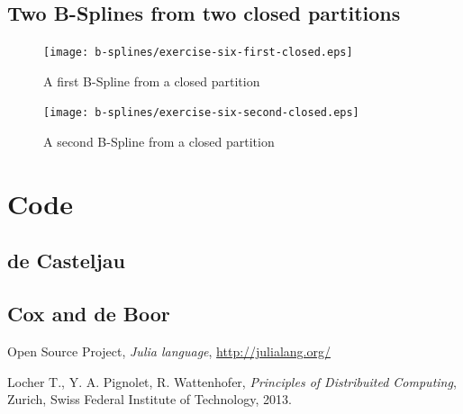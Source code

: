 \documentclass{article}
\begin{document}
\subsection{Two B-Splines from two closed partitions}
\begin{figure}
  \centering
  \texttt{[image: b-splines/exercise-six-first-closed.eps]}
  \caption{A first B-Spline from a closed partition }
  \label{fig:bspline-exercise-six-first}
\end{figure}

\begin{figure}
  \centering
  \texttt{[image: b-splines/exercise-six-second-closed.eps]}
  \caption{A second B-Spline from a closed partition }
  \label{fig:bspline-exercise-six-second}
\end{figure}


\section{Code}

\subsection{de Casteljau}
\label{sec:deCasteljau-code}


\subsection{Cox and de Boor}
\label{sec:Cox-deBoor-code}


\newpage

\begin{thebibliography}{}

 Open Source Project,
  \emph{Julia language}, \url{http://julialang.org/}

 Locher T., Y. A. Pignolet, R. Wattenhofer,
  \textit{Principles of Distribuited Computing}, Zurich, Swiss Federal
  Institute of Technology, 2013.


\end{thebibliography}
\end{document}
